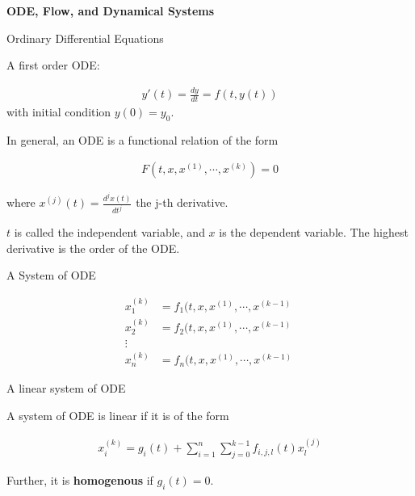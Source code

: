 \documentclass[aspectratio=169,xcolor=dvipsnames,svgnames,x11names,fleqn]{beamer}
\begin{document}
    \begin{frame}{}
    \begin{center}
        \huge \bf \color{DarkBlue}
        ODE, Flow, and Dynamical Systems
    \end{center}
    \end{frame}    
    
    
    \begin{frame}{Ordinary Differential Equations}
    
    A first order ODE:
    
    \begin{align*}
    y'(t) = \frac{dy}{dt} = f(t, y(t))
    \end{align*}
    with initial condition $y(0) = y_0$.
    
    In general, an ODE is a functional relation of the form 
    
    \begin{align*}
    F(t, x, x^{(1)}, \cdots, x^{(k)}) = 0
    \end{align*}

where $x^{(j)}(t) = \frac{d^j x(t)}{dt^j}$ the j-th derivative.

\vspace{5pt}

$t$ is called the independent variable, and $x$ is the dependent variable. The highest derivative is the order of the ODE.
    
    \end{frame}
    
    \begin{frame}{A System of ODE}
    
    \begin{align*}
    x_1^{(k)}&  = f_1(t, x, x^{(1)}, \cdots, x^{(k-1)}\\
    x_2^{(k)}&  = f_2(t, x, x^{(1)}, \cdots, x^{(k-1)}\\
    \vdots\\
    x_n^{(k)}&  = f_n(t, x, x^{(1)}, \cdots, x^{(k-1)}\
    \end{align*}
    
    \end{frame}
    
    \begin{frame}{A linear system of ODE}
    
    A system of ODE is linear if it is of the form 
    
    \begin{align*}
    x_i^{(k)} = g_i(t) + \sum_{i=1}^n \sum_{j=0}^{k-1} f_{i,j,l} (t) x_l^{(j)}
    \end{align*}
    
    Further, it is \textbf{homogenous} if $g_i(t) = 0$.
    
    \end{frame}
    
\end{document}
